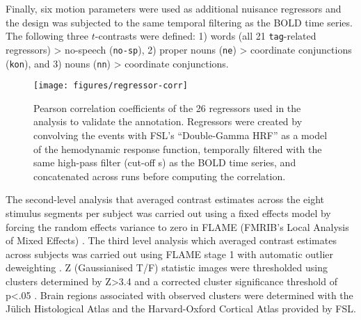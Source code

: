 \documentclass[10pt,a4paper,onecolumn]{article}
\begin{document}
Finally, six motion parameters were used as additional nuisance regressors and
the design was subjected to the same temporal filtering as the BOLD time series.
The following three $t$-contrasts were defined: 1) words (all 21
\texttt{tag}-related regressors) > no-speech (\texttt{no-sp}),
2) proper nouns (\texttt{ne}) > coordinate conjunctions (\texttt{kon}), and
3) nouns (\texttt{nn}) > coordinate conjunctions.

\begin{figure*} \centering
    \texttt{[image: figures/regressor-corr]} \caption{Pearson
        correlation coefficients of the 26 regressors used in the analysis to
        validate the annotation. Regressors were created by convolving the
        events with FSL's ``Double-Gamma HRF'' as a model of the hemodynamic
        response function, temporally filtered with the same high-pass filter
        (cut-off \unit[150]{s}) as the BOLD time series, and concatenated across
    runs before computing the correlation.}
    \label{fig:reg-corr}
\end{figure*}


The second-level analysis that averaged contrast estimates across the eight
stimulus segments per subject was carried out using a fixed effects model by
forcing the random effects variance to zero in FLAME (FMRIB's Local Analysis of
Mixed Effects) \citep{beckmann2003general, woolrich2004multilevel}.
The third level analysis which averaged contrast estimates across subjects was
carried out using FLAME stage 1 with automatic outlier deweighting
\citep{woolrich2004multilevel, woolrich2008robust}.
Z (Gaussianised T/F) statistic images were thresholded using clusters determined
by Z>3.4 and a corrected cluster significance threshold of p<.05
\citep{woolrich2008robust}.
Brain regions associated with observed clusters were determined with the Jülich
Histological Atlas \citep{eickhoff2005toolbox,eickhoff2007assignment} and the
Harvard-Oxford Cortical Atlas \citep{desikan2006automated} provided by FSL.
\end{document}
